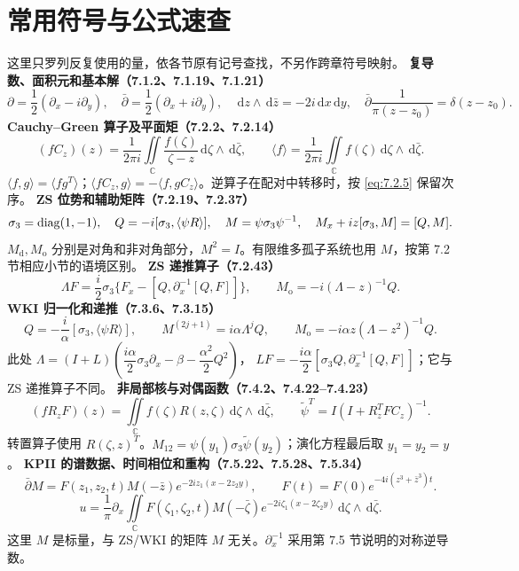 \documentclass[lang=cn,scheme=chinese,mode=simple,device=normal,color=blue,math=cm,thmcnt=section,12pt]{elegantbook}
\newcommand{\dd}{\,\mathrm{d}}
\begin{document}
\section*{常用符号与公式速查}
这里只罗列反复使用的量，依各节原有记号查找，不另作跨章符号映射。
\noindent\textbf{复导数、面积元和基本解（7.1.2、7.1.19、7.1.21）}
\[
\partial=\dfrac{1}{2}(\partial_x-i\partial_y),\quad \bar\partial=\dfrac{1}{2}(\partial_x+i\partial_y),\quad
\dd z\wedge\dd\bar z=-2i\dd x\dd y,\quad \bar\partial\dfrac{1}{\pi(z-z_0)}=\delta(z-z_0).
\]
\noindent\textbf{Cauchy--Green 算子及平面矩（7.2.2、7.2.14）}
\[
(fC_z)(z)=\dfrac{1}{2\pi i}\iint\limits_{\mathbb C}\dfrac{f(\zeta)}{\zeta-z}\dd\zeta\wedge\dd\bar\zeta,
\qquad \langle f\rangle=\dfrac{1}{2\pi i}\iint\limits_{\mathbb C}f(\zeta)\dd\zeta\wedge\dd\bar\zeta.
\]
$\langle f,g\rangle=\langle fg^T\rangle$；$\langle fC_z,g\rangle=-\langle f,gC_z\rangle$。逆算子在配对中转移时，按 \eqref{eq:7.2.5} 保留次序。
\noindent\textbf{ZS 位势和辅助矩阵（7.2.19、7.2.37）}
\[
\sigma_3=\operatorname{diag}(1,-1),\quad Q=-i[\sigma_3,\langle\psi R\rangle],\quad
M=\psi\sigma_3\psi^{-1},\quad M_x+iz[\sigma_3,M]=[Q,M].
\]
$M_{\mathrm d},M_{\mathrm o}$ 分别是对角和非对角部分，$M^2=I$。有限维多孤子系统也用 $M$，按第 7.2 节相应小节的语境区别。
\noindent\textbf{ZS 递推算子（7.2.43）}
\[
\Lambda F=\dfrac{i}{2}\sigma_3\{F_x-[Q,\partial_x^{-1}[Q,F]]\},\qquad
M_{\mathrm o}=-i(\Lambda-z)^{-1}Q.
\]
\noindent\textbf{WKI 归一化和递推（7.3.6、7.3.15）}
\[
Q=-\dfrac{i}{\alpha}[\sigma_3,\langle\psi R\rangle],\qquad
M^{(2j+1)}=i\alpha\Lambda^jQ,\qquad M_{\mathrm o}=-i\alpha z(\Lambda-z^2)^{-1}Q.
\]
此处 $\Lambda=(I+L)(\dfrac{i\alpha}{2}\sigma_3\partial_x-\beta-\dfrac{\alpha^2}{2}Q^2)$，
$LF=-\dfrac{i\alpha}{2}[\sigma_3Q,\partial_x^{-1}[Q,F]]$；它与 ZS 递推算子不同。
\noindent\textbf{非局部核与对偶函数（7.4.2、7.4.22--7.4.23）}
\[
(fR_zF)(z)=\iint\limits_{\mathbb C}f(\zeta)R(z,\zeta)\dd\zeta\wedge\dd\bar\zeta,
\qquad \widetilde\psi^T=I(I+R_z^TFC_z)^{-1}.
\]
转置算子使用 $R(\zeta,z)^T$。$M_{12}=\psi(y_1)\sigma_3\widetilde\psi(y_2)$；演化方程最后取 $y_1=y_2=y$。
\noindent\textbf{KPII 的谱数据、时间相位和重构（7.5.22、7.5.28、7.5.34）}
\[
\bar\partial M=F(z_1,z_2,t)M(-\bar z)e^{-2iz_1(x-2z_2y)},\qquad
F(t)=F(0)e^{-4i(z^3+\bar z^3)t}.
\]
\[
u=\dfrac{1}{\pi}\partial_x\iint\limits_{\mathbb C}
F(\zeta_1,\zeta_2,t)M(-\bar\zeta)e^{-2i\zeta_1(x-2\zeta_2y)}\dd\zeta\wedge\dd\bar\zeta.
\]
这里 $M$ 是标量，与 ZS/WKI 的矩阵 $M$ 无关。$\partial_x^{-1}$ 采用第 7.5 节说明的对称逆导数。
\end{document}
